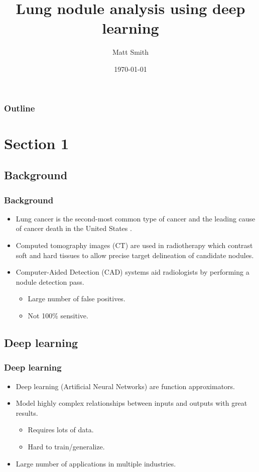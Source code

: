 \documentclass[11pt]{beamer}
\begin{document}


\title{Lung nodule analysis using deep learning}
\author{Matt Smith}
\date{\today}


\begin{frame}
\frametitle{Outline}
\tableofcontents
\end{frame}

\section{Section 1}
\subsection{Background}
\begin{frame}
\frametitle{Background}
\begin{itemize}
\item Lung cancer is the second-most common type of cancer and the leading cause of cancer death in the United States \cite{acs}.
\item  Computed tomography images (CT) are used in radiotherapy which contrast soft and hard tissues to allow precise target delineation of candidate nodules.
\item  Computer-Aided Detection (CAD) systems aid radiologists by performing a nodule detection pass.
\begin{itemize}
\item Large number of false positives.
\item Not 100\% sensitive.
\end{itemize}
\end{itemize}
\end{frame}

\subsection{Deep learning}
\begin{frame}
\frametitle{Deep learning}
\begin{itemize}

\item Deep learning (Artificial Neural Networks) are function approximators.
\item Model highly complex relationships between inputs and outputs with great results.
\begin{itemize}
\item Requires lots of data.
\item Hard to train/generalize.
\end{itemize}

\end{itemize}
\begin{itemize}
\item Large number of applications in multiple industries.
\end{itemize}
\end{frame}
\end{document}

